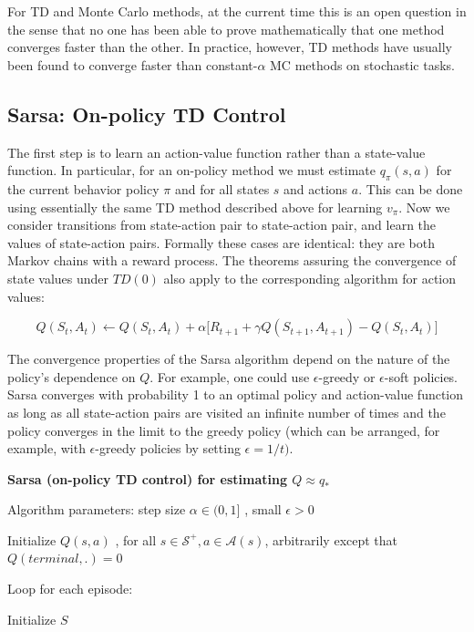 \documentclass{article}
\begin{document}
For TD and Monte Carlo methods, at the current time this is an open question in the sense that no one has been able to prove 
mathematically that one method converges faster than the other. In practice, however, TD methods have usually been found to converge faster than constant-$\alpha$ MC methods on stochastic tasks.

\subsection{Sarsa: On-policy TD Control}

The first step is to learn an action-value function rather than a state-value function. In particular, for an on-policy method we must estimate $q _ { \pi } ( s , a )$ 
for the current behavior policy $ \pi $ and for all states $s$ and actions $a$. This can be done using essentially the same TD method described above for learning $v _ { \pi }$. 
Now we consider transitions from state-action pair to state-action pair, and learn the values of state-action pairs. Formally these cases are identical: 
they are both Markov chains with a reward process. The theorems assuring the convergence of state values under $TD(0)$ also apply to the corresponding algorithm for action values:

$$
Q ( S _ { t } , A _ { t } ) \leftarrow Q ( S _ { t } , A _ { t } ) + \alpha \Big [ R _ { t + 1 } + \gamma Q ( S _ { t + 1 } , A _ { t + 1 } ) - Q ( S _ { t } , A _ { t } ) \Big ]
$$

The convergence properties of the Sarsa algorithm depend on the nature of the policy's dependence on $Q$. For example, one could use $\epsilon$-greedy or $\epsilon$-soft policies. 
Sarsa converges with probability 1 to an optimal policy and action-value function as long as all state-action pairs are visited an infinite number of times and the policy converges 
in the limit to the greedy policy (which can be arranged, for example, with $\epsilon$-greedy policies by setting $\epsilon = 1 / t )$.

\textbf{Sarsa (on-policy TD control) for estimating $Q \approx q_*$}

Algorithm parameters: step size $\alpha \in ( 0 , 1 ]$ , small $\epsilon > 0$

Initialize $Q ( s , a )$ , for all $s \in \mathcal { S } ^ { + } , a \in \mathcal { A } ( s )$, arbitrarily except that $Q(terminal,.) = 0$

Loop for each episode:

\hspace{.5cm} Initialize $S$
\end{document}
